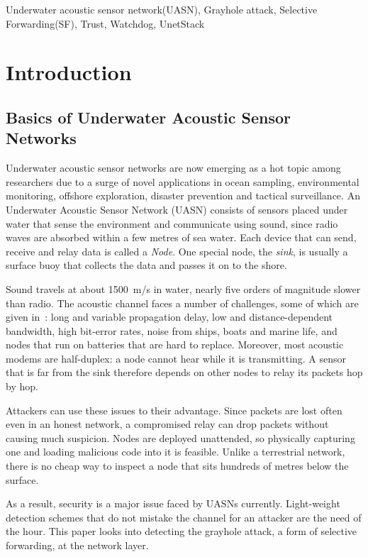 \documentclass[conference]{IEEEtran}
\begin{document}
\begin{IEEEkeywords}
Underwater acoustic sensor network(UASN), Grayhole attack, Selective Forwarding(SF), Trust, Watchdog, UnetStack
\end{IEEEkeywords}

\section{Introduction}

\subsection{Basics of Underwater Acoustic Sensor Networks}
Underwater acoustic sensor networks are now emerging as a hot topic among researchers due to a surge of novel applications in ocean sampling, environmental monitoring, offshore exploration, disaster prevention and tactical surveillance. An Underwater Acoustic Sensor Network (UASN) consists of sensors placed under water that sense the environment and communicate using sound, since radio waves are absorbed within a few metres of sea water. Each device that can send, receive and relay data is called a \emph{Node}. One special node, the \emph{sink}, is usually a surface buoy that collects the data and passes it on to the shore.

Sound travels at about 1500~m/s in water, nearly five orders of magnitude slower than radio. The acoustic channel faces a number of challenges, some of which are given in~\cite{akyildiz}: long and variable propagation delay, low and distance-dependent bandwidth, high bit-error rates, noise from ships, boats and marine life, and nodes that run on batteries that are hard to replace. Moreover, most acoustic modems are half-duplex: a node cannot hear while it is transmitting. A sensor that is far from the sink therefore depends on other nodes to relay its packets hop by hop.

Attackers can use these issues to their advantage. Since packets are lost often even in an honest network, a compromised relay can drop packets without causing much suspicion. Nodes are deployed unattended, so physically capturing one and loading malicious code into it is feasible. Unlike a terrestrial network, there is no cheap way to inspect a node that sits hundreds of metres below the surface.

As a result, security is a major issue faced by UASNs currently. Light-weight detection schemes that do not mistake the channel for an attacker are the need of the hour. This paper looks into detecting the grayhole attack, a form of selective forwarding, at the network layer.
\end{document}
